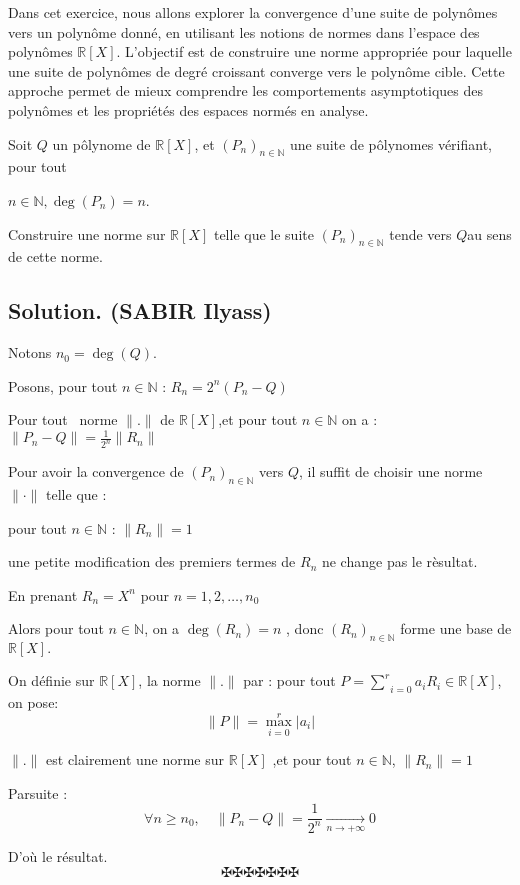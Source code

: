 Dans cet exercice, nous allons explorer la convergence d'une suite de
polyn{\^o}mes vers un polyn{\^o}me donn{\'e}, en utilisant les notions de
normes dans l'espace des polyn{\^o}mes $\mathbb{R} [X]$. L'objectif est de
construire une norme appropri{\'e}e pour laquelle une suite de polyn{\^o}mes
de degr{\'e} croissant converge vers le polyn{\^o}me cible. Cette approche
permet de mieux comprendre les comportements asymptotiques des polyn{\^o}mes
et les propri{\'e}t{\'e}s des espaces norm{\'e}s en analyse.

\begin{exercise}
Soit $Q$ un p{\^o}lynome de $\mathbb{R} [X]$, et $(P_n)_{n \in \mathbb{N}}$
une suite de p{\^o}lynomes v{\'e}rifiant, pour tout

$n \in \mathbb{N}, \deg (P_n)  = n$.

Construire une norme sur $\mathbb{R} [X]$ telle que le suite $(P_n)_{n \in
\mathbb{N}}$ tende vers $Q$au sens de cette norme.

\end{exercise}

\subsection*{Solution. (SABIR Ilyass)}


Notons $n_0 = \deg (Q)$.

Posons, pour tout $n \in \mathbb{N}$ : $R_n = 2^n (P_n - Q)$

Pour tout \ norme $\| . \|$ de $\mathbb{R} [X]$,et pour tout $n \in
\mathbb{N}$ on a : $\| P_n - Q \| = \frac{1}{2^n} \| R_n \|$

Pour avoir la convergence de $(P_n)_{n \in \mathbb{N}}$ vers $Q$, il suffit de choisir une norme $\| \cdot \|$ telle que :


pour tout $n \in \mathbb{N}$ : $\| R_n \| = 1$

une petite modification des premiers termes de $R_n$ ne change pas le
r{\`e}sultat.

En prenant $R_n = X^n$ pour $n = 1, 2, \ldots, n_0$

Alors pour tout $n \in \mathbb{N}$, on a $\deg (R_n) = n$ , donc $(R_n)_{n \in
\mathbb{N}}$ forme une base de $\mathbb{R} [X] .$

On d{\'e}finie sur $\mathbb{R} [X]$, la norme $\| . \|$ par : pour tout $P =
\underset{i = 0}{\overset{r}{\sum}} a_i  R_i \in \mathbb{R} [X]$, on pose:
\[ \| P \| = \underset{i = 0}{\overset{r}{\max}} | a_i | \]


$\| . \|$ est clairement une norme sur $\mathbb{R} [X]$ ,et pour tout $n \in
\mathbb{N}$, $\| R_n \| = 1$

Parsuite :
\[ \forall n \geq n_0, \quad \| P_n - Q \| = \frac{1}{2^n} \underset{n
   \rightarrow + \infty}{\longrightarrow} 0 \]


D'o{\`u} le r{\'e}sultat.
\[ \maltese \maltese \maltese \maltese \maltese \maltese \maltese \]
